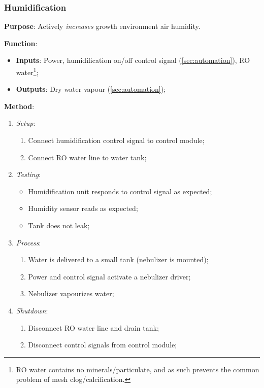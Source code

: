 \subsubsection{Humidification}
\label{sec:humidification}

\textbf{Purpose}: Actively \textit{increases} growth environment air humidity.

\textbf{Function}:
\begin{itemize}
    \item \textbf{Inputs}: Power, humidification on/off control signal (\ref{sec:automation}), RO water\footnote{RO water contains no minerals/particulate, and as such prevents the common problem of mesh clog/calcification.};
    \item \textbf{Outputs}: Dry water vapour (\ref{sec:automation});
\end{itemize}

\textbf{Method}:
\begin{enumerate}
    \item \textit{Setup}:
    \begin{enumerate}
        \item Connect humidification control signal to control module;
        \item Connect RO water line to water tank;
    \end{enumerate}
    \item \textit{Testing}:
    \begin{itemize}
        \item Humidification unit responds to control signal as expected;
        \item Humidity sensor reads as expected;
        \item Tank does not leak;
    \end{itemize}
    \item \textit{Process}:
    \begin{enumerate}
        \item Water is delivered to a small tank (nebulizer is mounted);
        \item Power and control signal activate a nebulizer driver;
        \item Nebulizer vapourizes water;
    \end{enumerate}
    \item \textit{Shutdown}:
    \begin{enumerate}
        \item Disconnect RO water line and drain tank;
        \item Disconnect control signals from control module;
    \end{enumerate}
\end{enumerate}

